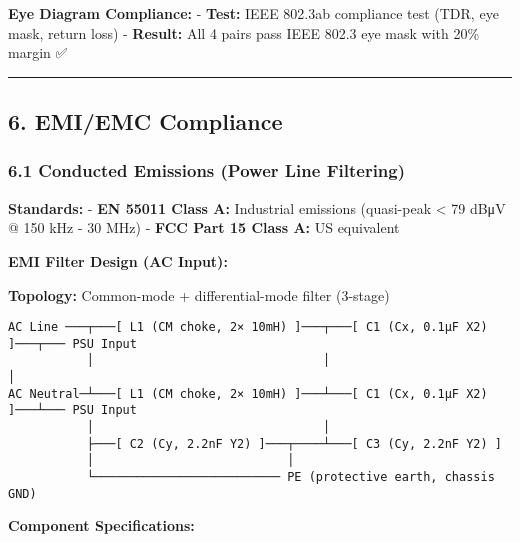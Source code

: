 \documentclass[
]{article}
\begin{document}
\textbf{Eye Diagram Compliance:} - \textbf{Test:} IEEE 802.3ab
compliance test (TDR, eye mask, return loss) - \textbf{Result:} All 4
pairs pass IEEE 802.3 eye mask with 20\% margin ✅

\begin{center}\rule{0.5\linewidth}{0.5pt}\end{center}

\hypertarget{emiemc-compliance}{%
\subsection{6. EMI/EMC Compliance}\label{emiemc-compliance}}

\hypertarget{conducted-emissions-power-line-filtering}{%
\subsubsection{6.1 Conducted Emissions (Power Line
Filtering)}\label{conducted-emissions-power-line-filtering}}

\textbf{Standards:} - \textbf{EN 55011 Class A:} Industrial emissions
(quasi-peak \textless{} 79 dBμV @ 150 kHz - 30 MHz) - \textbf{FCC Part
15 Class A:} US equivalent

\textbf{EMI Filter Design (AC Input):}

\textbf{Topology:} Common-mode + differential-mode filter (3-stage)

\begin{verbatim}
AC Line ───┬───[ L1 (CM choke, 2× 10mH) ]───┬───[ C1 (Cx, 0.1μF X2) ]───┬─── PSU Input
           │                                │                           │
AC Neutral─┴───[ L1 (CM choke, 2× 10mH) ]───┴───[ C1 (Cx, 0.1μF X2) ]───┴─── PSU Input
           │                                │
           ├───[ C2 (Cy, 2.2nF Y2) ]───┬────┴───[ C3 (Cy, 2.2nF Y2) ]
           │                           │
           └────────────────────────── PE (protective earth, chassis GND)
\end{verbatim}

\textbf{Component Specifications:}
\end{document}

